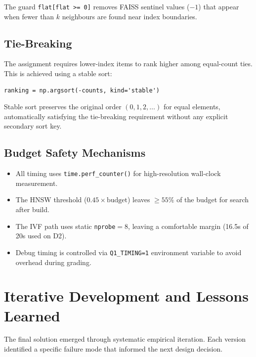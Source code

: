 \documentclass[11pt,a4paper]{article}
\newcommand{\code}[1]{\texttt{\small #1}}
\begin{document}
The guard \code{flat[flat >= 0]} removes FAISS sentinel values ($-1$) that
appear when fewer than $k$ neighbours are found near index boundaries.

\subsection{Tie-Breaking}

The assignment requires lower-index items to rank higher among equal-count
ties. This is achieved using a stable sort:

\begin{lstlisting}[style=pycode]
ranking = np.argsort(-counts, kind='stable')
\end{lstlisting}

Stable sort preserves the original order $(0, 1, 2, \ldots)$ for equal
elements, automatically satisfying the tie-breaking requirement without any
explicit secondary sort key.

\subsection{Budget Safety Mechanisms}

\begin{itemize}[leftmargin=1.5em]
  \item All timing uses \code{time.perf\_counter()} for high-resolution
        wall-clock measurement.
  \item The HNSW threshold ($0.45 \times \text{budget}$) leaves $\geq 55\%$
        of the budget for search after build.
  \item The IVF path uses static \texttt{nprobe}$=8$, leaving a comfortable
        margin (16.5s of 20s used on D2).
  \item Debug timing is controlled via \code{Q1\_TIMING=1} environment
        variable to avoid overhead during grading.
\end{itemize}

\section{Iterative Development and Lessons Learned}

The final solution emerged through systematic empirical iteration. Each version
identified a specific failure mode that informed the next design decision.
\end{document}
